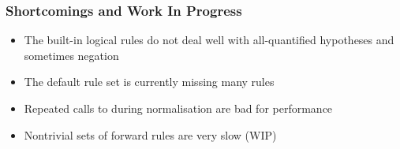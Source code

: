\documentclass[xetex]{beamer}
\begin{document}
\begin{frame}
  \frametitle{Shortcomings and Work In Progress}

  \begin{itemize}[<+->]
    \item The built-in logical rules do not deal well with all-quantified hypotheses and sometimes negation
    \item The default rule set is currently missing many rules
    \item Repeated calls to  during normalisation are bad for performance
    \item Nontrivial sets of forward rules are very slow (WIP)
  \end{itemize}
\end{frame}
\end{document}
